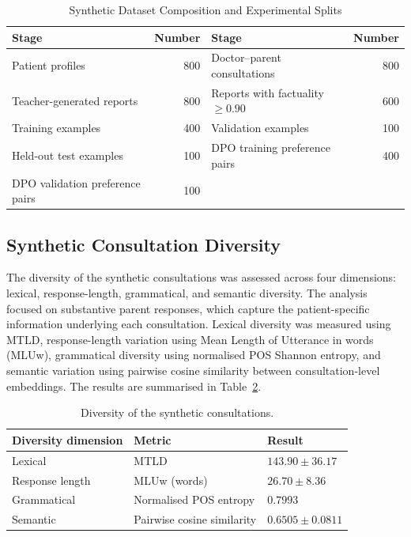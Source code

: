 \documentclass[ %
                    author={Aman Kumar Singh},
                supervisor={Dr. Edwin Simpson},
                    degree={MSc},
                     title={Quality-Aware Knowledge Distillation of Large Language Models for Efficient Personalised Clinical Report Generation},
                  subtitle={},
                      type={},
                      year={2021}]{dissertation}
\begin{document}
\begin{table}[htbp]
\centering
\footnotesize
\caption{Synthetic Dataset Composition and Experimental Splits}
\label{tab:dataset_composition}
\begin{tabular}{lr@{\qquad}lr}
\hline
\textbf{Stage} & \textbf{Number} &
\textbf{Stage} & \textbf{Number} \\
\hline
Patient profiles & 800 &
Doctor--parent consultations & 800 \\

Teacher-generated reports & 800 &
Reports with factuality $\geq 0.90$ & 600 \\

Training examples & 400 &
Validation examples & 100 \\

Held-out test examples & 100 &
DPO training preference pairs & 400 \\

DPO validation preference pairs & 100 &
& \\

\hline
\end{tabular}
\end{table}
\subsection{Synthetic Consultation Diversity}
\label{sec:synthetic_consultation_diversity}

The diversity of the synthetic consultations was assessed across four
dimensions: lexical, response-length, grammatical, and semantic diversity.
The analysis focused on substantive parent responses, which capture the
patient-specific information underlying each consultation. Lexical diversity
was measured using MTLD, response-length variation using Mean Length of
Utterance in words (MLUw), grammatical diversity using normalised POS
Shannon entropy, and semantic variation using pairwise cosine similarity
between consultation-level embeddings. The results are summarised in
Table~\ref{tab:consultation_diversity}.
\vspace{-15pt}

\begin{table}[H]
\centering
\footnotesize
\caption{Diversity of the synthetic consultations.}
\label{tab:consultation_diversity}
\begin{tabular}{lll}
\hline
\textbf{Diversity dimension} & \textbf{Metric} & \textbf{Result} \\
\hline
Lexical & MTLD & $143.90 \pm 36.17$ \\
Response length & MLUw (words) & $26.70 \pm 8.36$ \\
Grammatical & Normalised POS entropy & $0.7993$ \\
Semantic & Pairwise cosine similarity & $0.6505 \pm 0.0811$ \\
\hline
\end{tabular}
\end{table}
\end{document}

